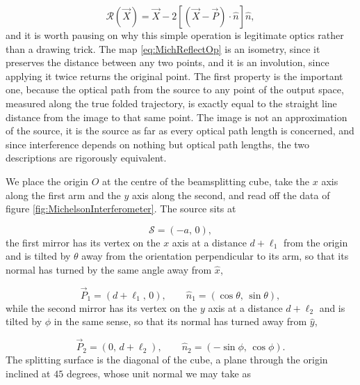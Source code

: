         \begin{equation}\label{eq:MichReflectOp}
            \mathcal{R}\left(\vec{X}\right) = \vec{X} - 2\left[\left(\vec{X}-\vec{P}\right)\cdot\hat{n}\right]\hat{n},
        \end{equation}
        and it is worth pausing on why this simple operation is legitimate optics rather than a drawing trick. The map \ref{eq:MichReflectOp} is an isometry, since it preserves the distance between any two points, and it is an involution, since applying it twice returns the original point. The first property is the important one, because the optical path from the source to any point of the output space, measured along the true folded trajectory, is exactly equal to the straight line distance from the image to that same point. The image is not an approximation of the source, it is the source as far as every optical path length is concerned, and since interference depends on nothing but optical path lengths, the two descriptions are rigorously equivalent.

        We place the origin $O$ at the centre of the beamsplitting cube, take the $x$ axis along the first arm and the $y$ axis along the second, and read off the data of figure \ref{fig:MichelsonInterferometer}. The source sits at

        \begin{equation}\label{eq:MichSource}
            \mathcal{S} = \left(-a,\,0\right),
        \end{equation}
        the first mirror has its vertex on the $x$ axis at a distance $d+\ell_1$ from the origin and is tilted by $\theta$ away from the orientation perpendicular to its arm, so that its normal has turned by the same angle away from $\hat{x}$,

        \begin{equation}\label{eq:MichM1}
            \vec{P}_1 = \left(d+\ell_1,\,0\right), \qquad \hat{n}_1 = \left(\cos\theta,\,\sin\theta\right),
        \end{equation}
        while the second mirror has its vertex on the $y$ axis at a distance $d+\ell_2$ and is tilted by $\phi$ in the same sense, so that its normal has turned away from $\hat{y}$,

        \begin{equation}\label{eq:MichM2}
            \vec{P}_2 = \left(0,\,d+\ell_2\right), \qquad \hat{n}_2 = \left(-\sin\phi,\,\cos\phi\right).
        \end{equation}
        The splitting surface is the diagonal of the cube, a plane through the origin inclined at $45$ degrees, whose unit normal we may take as

